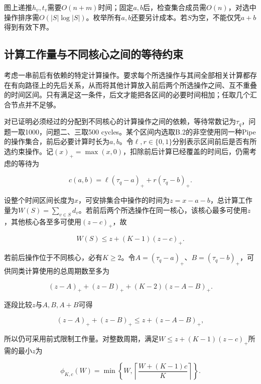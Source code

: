 \documentclass[anonymous,notoc]{gmcm2026}
\begin{document}
图上递推\(h_v,t_v\)需要\(O(n+m)\)时间；固定\(a,b\)后，检查集合成员需\(O(n)\)，对选中操作排序需\(O(|S|\log|S|)\)。枚举所有\(a,b\)还要另计成本。若\(S\)为空，不能仅凭\(a+b\)得到有效下界。

\subsection{计算工作量与不同核心之间的等待约束}

考虑一串前后有依赖的特定计算操作。要求每个所选操作与其间全部相关计算都存在有向路径上的先后关系，从而将其他计算放入前后两个所选操作之间、互不重叠的时间区间。只有满足这一条件，后文才能把各区间的必要时间相加；任取几个汇合节点并不足够。

对已证明必须经过的分配到不同核心的计算操作之间的依赖，等待常数记为\(\tau_q\)，问题一取1000，问题二、三取500 cycles。某个区间内选取B.2的非空使用同一种Pipe的操作集合，前后必要计算时长为\(a,b\)。令\(\ell,r\in\{0,1\}\)分别表示区间前后是否有所选约束操作。记\((x)_+=\max(x,0)\)，扣除前后计算已经覆盖的时间后，仍需考虑的等待为

\begin{equation}
c(a,b)=\ell(\tau_q-a)_++r(\tau_q-b)_+.
\end{equation}

设整个时间区间长度为\(x\)，可安排集合中操作的时间为\(z=x-a-b\)，总计算工作量为\(W(S)=\sum_{v\in S}d_v\)。若前后两个所选操作在同一核心，该核心最多可使用\(z\)，其他核心各至多可使用\((z-c)_+\)，故

\begin{equation}
W(S)\le z+(K-1)(z-c)_+.
\end{equation}

若前后操作位于不同核心，必有\(K\ge2\)。令\(A=(\tau_q-a)_+\)、\(B=(\tau_q-b)_+\)，可供同类计算使用的总周期数至多为

\begin{equation}
(z-A)_++(z-B)_++(K-2)(z-A-B)_+.
\end{equation}

逐段比较\(z\)与\(A,B,A+B\)可得

\begin{equation}
(z-A)_++(z-B)_+\le z+(z-A-B)_+,
\end{equation}

所以仍可采用前式限制工作量。对整数周期，满足\(W\le z+(K-1)(z-c)_+\)所需的最小\(z\)为

\begin{equation}
\phi_{K,c}(W)=\min\left\{W,\left\lceil\frac{W+(K-1)c}{K}\right\rceil\right\}.
\end{equation}
\end{document}

